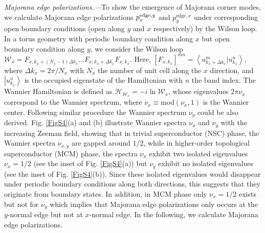 \documentclass[twocolumn,prl,floatfix,citeautoscript,nofootinbib,superscriptaddress]{revtex4}
\begin{document}
\emph{Majorana edge polarizations}{\emph{.---}}To show the emergence of
Majorana corner modes, we calculate Majorana edge polarizations $p_{x}^{%
\mathrm{edge},y}$ and $p_{y}^{\mathrm{edge},x}$ under corresponding open
boundary conditions (open along $y$ and $x$ respectively) by the Wilson
loop. In a torus geometry with periodic boundary condition along $x$ but
open boundary condition along $y$, we consider the Wilson loop $\mathcal{W}%
_{x}=F_{x,k_{x}+\left( N_{x}-1\right) \Delta k_{x}}...F_{x,k_{x}+\Delta
k_{x}}F_{x,k_{x}}$. Here, $\left[ F_{x,k_{x}}\right] ^{mn}=\left\langle
u_{k_{x}+\Delta k_{x}}^{m}|u_{k_{x}}^{n}\right\rangle $, where $\Delta
k_{x}=2\pi /N_{x}$ with $N_{x}$ the number of unit cell along the $x$
direction, and $\left\vert u_{k_{x}}^{n}\right\rangle $ is the occupied
eigenstate of the Hamiltonian with $n$ the band index. The Wannier
Hamiltonian is defined as $\mathcal{H}_{\mathcal{W}_{x}}=-i\ln \mathcal{W}%
_{x}$, whose eigenvalues $2\pi \nu _{x}$ correspond to the Wannier spectrum,
where $\nu _{x}\equiv$mod$\left( \nu _{x},1\right) $ is the Wannier center.
Following similar procedure the Wannier spectrum $\nu _{y}$ could be also
derived. Fig. \ref{FigS4}(a) and (b) illustrate Wannier spectra $\nu _{x}$
and $\nu _{y}$ with the increasing Zeeman field, showing that in trivial
superconductor (NSC) phase, the Wannier spectra $\nu _{x,y}$ are gapped
around $1/2$, while in higher-order topological superconductor (MCM) phase,
the spectra $\nu _{x}$ exhibit two isolated eigenvalues $\nu _{x}=1/2$ (see
the inset of Fig. \ref{FigS4}(a)) but $\nu _{y}$ exhibit no isolated
eigenvalues (see the inset of Fig. \ref{FigS4}(b)). Since these isolated
eigenvalues would disappear under periodic boundary conditions along both
directions, this suggests that they originate from boundary states. In
addition, in MCM phase only $\nu _{x}=1/2$ exists but not for $\nu _{y}$
which implies that Majorana edge polarizations only occurs at the $y$-normal
edge but not at $x$-normal edge. In the following, we calculate Majorana
edge polarizations.
\end{document}
